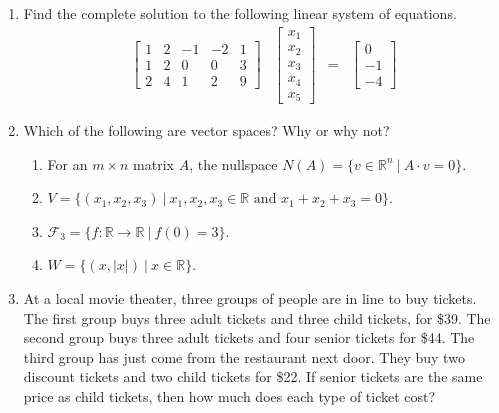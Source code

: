 \documentclass[10pt]{amsart}
\newcommand{\R}{\mathbb R}
\begin{document}
\begin{enumerate}
\vfill\pagebreak

\item Find the complete solution to the following linear system of
equations.
$$
\begin{array}{cccc}
	\left[\begin{array}{rrrrr}
		1&2&-1&-2&1\\
		1&2&0&0&3\\
		2&4&1&2&9
	\end{array}\right] &
	\left[\begin{array}{c}x_1\\x_2\\x_3\\x_4\\x_5\end{array}\right] &
	= &
	\left[\begin{array}{r}0\\-1\\-4\end{array}\right]
\end{array}
$$




\vfill\pagebreak

\item Which of the following are vector spaces?  Why or why not?

\begin{enumerate}
\item For an $m\times n$ matrix $A$, the nullspace $N(A)=\{ v\in\R^n\
|\ A\cdot v=0\}$.
\vfill
\item $V=\{ (x_1,x_2,x_3)\ |\ x_1,x_2,x_3\in\R\mbox{ and }
x_1+x_2+x_3=0\}$.
\vfill
\item $\mathcal{F}_3=\{ f:\R\to\R\ |\ f(0)=3\}$.
\vfill
\item $W=\{ (x,|x|)\ |\ x\in\R\}$.
\end{enumerate}


\vfill\pagebreak

%

\item At a local movie theater, three groups of people are in line to
buy tickets.  The first group buys three adult tickets and three child 
tickets, for \$39.  The second group buys three adult tickets and four 
senior tickets for \$44.  The third group has just come from the
restaurant next door.  They buy two discount tickets and two child
tickets for \$22.  If senior tickets are the same price as child
tickets, then how much does each type of ticket cost?


\end{enumerate}
\end{document}
